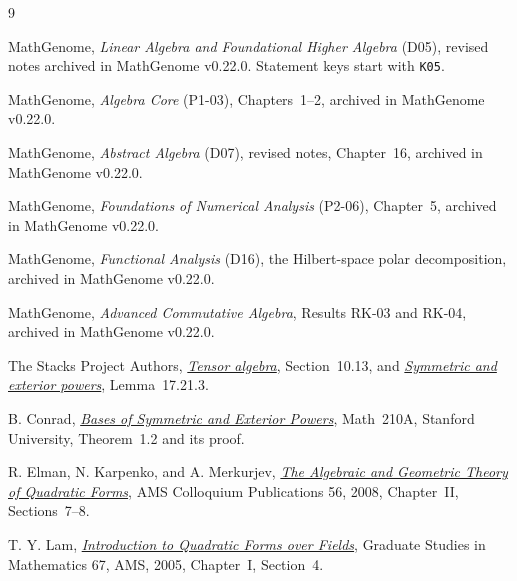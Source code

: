 \documentclass[11pt,oneside,openany]{book}
\theoremstyle{definition}
\theoremstyle{remark}
\begin{document}
\backmatter
{\raggedright
\begin{thebibliography}{9}

MathGenome, \emph{Linear Algebra and Foundational Higher Algebra}
(D05), revised notes archived in MathGenome v0.22.0.
Statement keys start with \texttt{K05}.

MathGenome, \emph{Algebra Core} (P1-03), Chapters~1--2, archived
in MathGenome v0.22.0.

MathGenome, \emph{Abstract Algebra} (D07), revised notes,
Chapter~16, archived in MathGenome v0.22.0.

MathGenome, \emph{Foundations of Numerical Analysis} (P2-06),
Chapter~5, archived in MathGenome v0.22.0.

MathGenome, \emph{Functional Analysis} (D16), the Hilbert-space
polar decomposition, archived in MathGenome v0.22.0.

MathGenome, \emph{Advanced Commutative Algebra}, Results RK-03
and RK-04, archived in MathGenome v0.22.0.

The Stacks Project Authors,
\href{https://stacks.math.columbia.edu/tag/00DM}{\emph{Tensor algebra}},
Section~10.13, and
\href{https://stacks.math.columbia.edu/tag/01CI}{\emph{Symmetric and exterior powers}},
Lemma~17.21.3.

B. Conrad, \href{https://math.stanford.edu/~conrad/210APage/handouts/symmwedgebasis.pdf}{\emph{Bases of Symmetric and Exterior Powers}},
Math~210A, Stanford University, Theorem~1.2 and its proof.

R. Elman, N. Karpenko, and A. Merkurjev,
\href{https://www.math.ucla.edu/~rse/book/Kniga.pdf}{\emph{The Algebraic and Geometric Theory of Quadratic Forms}},
AMS Colloquium Publications 56, 2008, Chapter~II, Sections~7--8.

T. Y. Lam,
\href{https://doi.org/10.1090/gsm/067}{\emph{Introduction to Quadratic Forms over Fields}},
Graduate Studies in Mathematics 67, AMS, 2005, Chapter~I, Section~4.

\end{thebibliography}
}
\end{document}
